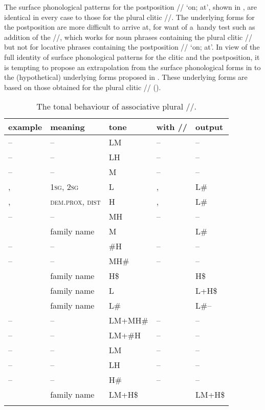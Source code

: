 The surface phonological patterns for the postposition // ‘on; at', shown in , are identical in every case to those for the plural clitic //. The underlying forms for the postposition are more difficult to arrive at, for want of a~handy test such as addition of the  //, which works for noun phrases containing the plural clitic // but not for locative phrases containing the postposition // ‘on; at'. In view of the full identity of surface phonological patterns for the clitic and the postposition, it is tempting to propose an extrapolation from the surface phonological forms in  to the (hypothetical) underlying forms proposed in . These underlying forms are based on those obtained for the plural clitic // (). 

\begin{table}%
\caption{\label{tab:thetonalbehaviourofassociativeplural}The tonal behaviour of associative plural //.}
\begin{tabularx}{\textwidth}{ l Q l Q l }
\lsptoprule
	example & meaning & tone & with // & output\\ \midrule
	– & – & LM & – & –\\
	– & – & LH & – & –\\
	– & – & M & – & –\\
	,  & \textsc{1sg}, \textsc{2sg} & L & ,   & L\#\\
	,  & \textsc{dem}.\textsc{prox}, \textsc{dist} & H & ,  & L\#\\
	– & – & MH & – & –\\ \addlinespace \hdashline \addlinespace
	 & family name & M &  & L\#\\
	– & – & \#H & – & –\\
	– & – & MH\# & – & –\\
	 & family name & H\$ &  & H\$\\
	 & family name & L &  & L+H\$\\
	 & family name & L\# &  & L\#--\\
	– & – & LM+MH\# & – & –\\
	– & – & LM+\#H & – & –\\
	– & – & LM & – & –\\
	– & – & LH & – & –\\
	– & – & H\# & – & –\\
	 & family name & LM+H\$ &  & LM+H\$\\
\lspbottomrule
\end{tabularx}
\end{table}


